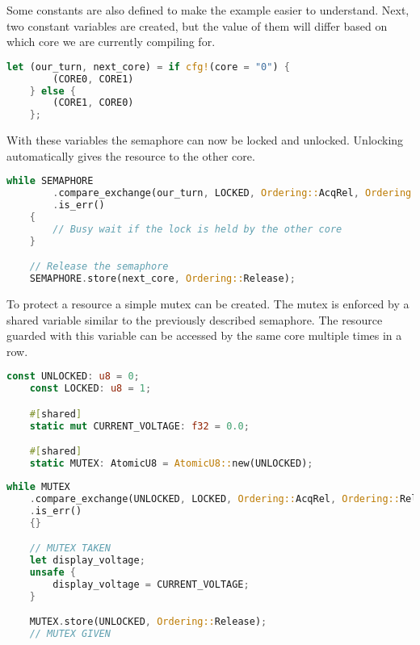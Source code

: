 Some constants are also defined to make the example easier to understand. Next, two constant variables are created, but the value of them will differ based on which core we are currently compiling for.

\begin{lstlisting}[language=Rust,frame=single,float=!ht,style=customrust,label={lst:sw-semaphore2},caption={Software Semaphore Core Specific Variables}]
    let (our_turn, next_core) = if cfg!(core = "0") {
        (CORE0, CORE1)
    } else {
        (CORE1, CORE0)
    };
\end{lstlisting}

With these variables the semaphore can now be locked and unlocked. Unlocking automatically gives the resource to the other core.

\begin{lstlisting}[language=Rust,frame=single,float=!ht,style=customrust,label={lst:sw-semaphore3},caption={Software Semaphore Locking and Unlocking}]
    while SEMAPHORE
        .compare_exchange(our_turn, LOCKED, Ordering::AcqRel, Ordering::Relaxed)
        .is_err()
    {
        // Busy wait if the lock is held by the other core
    }

    // Release the semaphore
    SEMAPHORE.store(next_core, Ordering::Release);
\end{lstlisting}

To protect a resource a simple mutex can be created. The mutex is enforced by a shared variable similar to the previously described semaphore. The resource guarded with this variable can be accessed by the same core multiple times in a row.

\begin{lstlisting}[language=Rust,frame=single,float=!ht,style=customrust,label={lst:sw-mutex1},caption={Mutex For a Variable}]
    const UNLOCKED: u8 = 0;
    const LOCKED: u8 = 1;

    #[shared]
    static mut CURRENT_VOLTAGE: f32 = 0.0;

    #[shared]
    static MUTEX: AtomicU8 = AtomicU8::new(UNLOCKED);
\end{lstlisting}

\begin{lstlisting}[language=Rust,frame=single,float=!ht,style=customrust,label={lst:sw-mutex2},caption={Performing a Read Operation Using a Mutex}]
    while MUTEX
    .compare_exchange(UNLOCKED, LOCKED, Ordering::AcqRel, Ordering::Relaxed)
    .is_err()
    {}

    // MUTEX TAKEN
    let display_voltage;
    unsafe {
        display_voltage = CURRENT_VOLTAGE;
    }

    MUTEX.store(UNLOCKED, Ordering::Release);
    // MUTEX GIVEN
\end{lstlisting}

